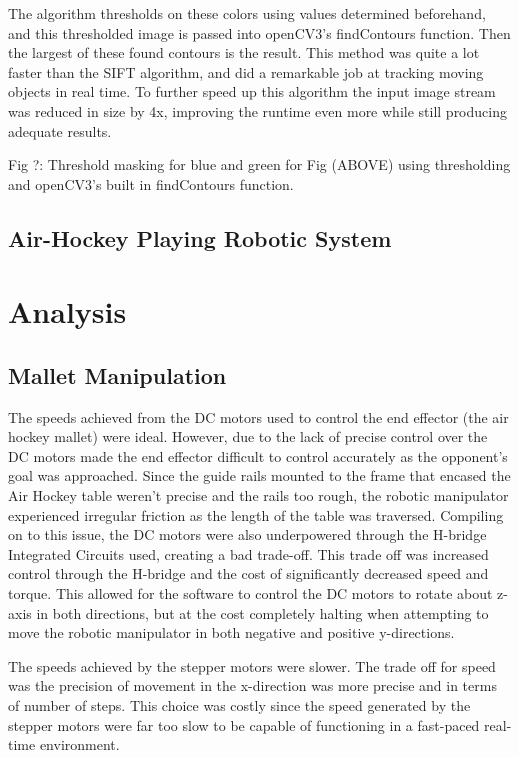 \documentclass[letterpaper, 12 pt, conference]{ieeeconf}
\begin{document}
The algorithm thresholds on these colors using values determined beforehand, and this thresholded image is passed into openCV3’s findContours function. Then the largest of these found contours is the result. This method was quite a lot faster than the SIFT algorithm, and did a remarkable job at tracking moving objects in real time. To further speed up this algorithm the input image stream was reduced in size by 4x, improving the runtime even more while still producing adequate results. 


Fig ?: Threshold masking for blue and green for Fig (ABOVE) using thresholding and openCV3’s built in findContours function.

\subsection{Air-Hockey Playing Robotic System}
\label{failure}

\section{Analysis}
\label{analysis}
\subsection{Mallet Manipulation}
\label{analysis-malletmanipulation}
The speeds achieved from the DC motors used to control the end effector (the air hockey mallet) were ideal.  However, due to the lack of precise control over the DC motors made the end effector difficult to control accurately as the opponent’s goal was approached.  Since the guide rails mounted to the frame that encased the Air Hockey table weren’t precise and the rails too rough, the robotic manipulator experienced irregular friction as the length of the table was traversed. Compiling on to this issue, the DC motors were also underpowered through the H-bridge Integrated Circuits used, creating a bad trade-off. This trade off was increased control through the H-bridge and the cost of significantly decreased speed and torque. This allowed for the software to control the DC motors to rotate about z-axis in both directions, but at the cost completely halting when attempting to move the robotic manipulator in both negative and positive y-directions.

The speeds achieved by the stepper motors were slower.  The trade off for speed was the precision of movement in the x-direction was more precise and in terms of number of steps. This choice was costly since the speed generated by the stepper motors were far too slow to be capable of functioning in a fast-paced real-time environment.
\end{document}
